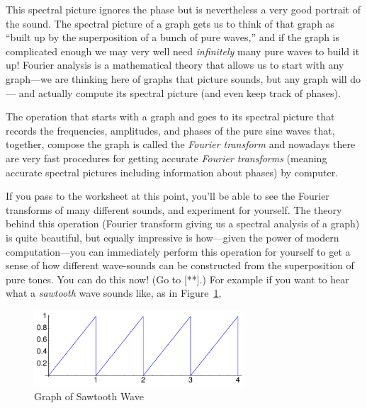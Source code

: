 \documentclass[11pt,draft]{article}
\theoremstyle{plain}
\theoremstyle{definition}
\numberwithin{equation}{section}
\numberwithin{figure}{section}
\numberwithin{table}{section}
\begin{document}
This spectral picture ignores the phase but is nevertheless a very
good portrait of the sound.  The spectral picture of a graph gets us
to think of that graph as ``built up by the superposition of a bunch
of pure waves,'' and if the graph is complicated enough we may very well
need {\em infinitely} many pure waves to build it up!  Fourier analysis is a
mathematical theory that allows us to start with any graph---we are
thinking here of graphs that picture sounds, but any graph will do---
and actually compute its spectral picture (and even keep track of
phases).
 
 
The operation that starts with a graph and goes to its spectral
picture that records the frequencies, amplitudes, and phases of the
pure sine waves that, together, compose the graph is called the {\em
  Fourier transform} and nowadays there are very fast procedures for
getting accurate {\em Fourier transforms} (meaning accurate spectral
pictures including information about phases) by computer.
 
 
If you pass to the worksheet at this point, you'll be able to see the
Fourier transforms of many different sounds, and experiment for
yourself.  The theory behind this operation (Fourier transform giving
us a spectral analysis of a graph) is quite beautiful, but equally
impressive is how---given the power of modern computation---you can
immediately perform this operation for yourself to get a sense of how
different wave-sounds can be constructed from the superposition of
pure tones.  You can do this now!  (Go to [**].)  For example if you
want to hear what a {\em sawtooth} wave sounds like, as in
Figure~\ref{fig:sawtooth}, 
   
   
\begin{figure}[H]
\begin{center}
\includegraphics[width=0.7\textwidth]{illustrations/sawtooth}
\end{center}
\caption{Graph of Sawtooth Wave\label{fig:sawtooth}}
\end{figure}
\end{document}
